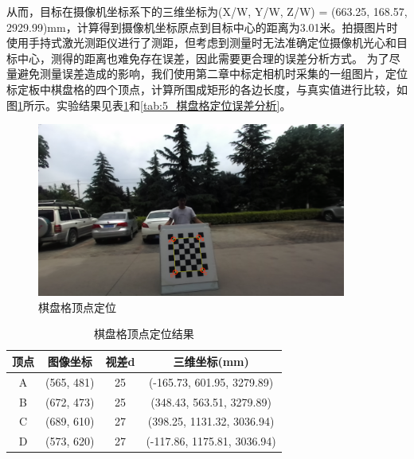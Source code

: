 从而，目标在摄像机坐标系下的三维坐标为(X/W, Y/W, Z/W) = (663.25, 168.57, 2929.99)mm，计算得到摄像机坐标原点到目标中心的距离为3.01米。拍摄图片时使用手持式激光测距仪进行了测距，但考虑到测量时无法准确定位摄像机光心和目标中心，测得的距离也难免存在误差，因此需要更合理的误差分析方式。
为了尽量避免测量误差造成的影响，我们使用第二章中标定相机时采集的一组图片，定位标定板中棋盘格的四个顶点，计算所围成矩形的各边长度，与真实值进行比较，如图\ref{fig:5_3_棋盘格顶点定位}所示。实验结果见表\ref{tab:5_棋盘格顶点定位结果}和\ref{tab:5_棋盘格定位误差分析}。
\begin{figure}[htb] %
	\centering
	\includegraphics[width=4in]{figures/5_实验结果/chessboard_corner}
	\caption{棋盘格顶点定位}\label{fig:5_3_棋盘格顶点定位}
\end{figure}

\begin{table}[htb] %
	\centering
	\caption{棋盘格顶点定位结果}
	\label{tab:5_棋盘格顶点定位结果}
	\begin{small}
		\begin{tabular*}{\textwidth}{@{\extracolsep{\fill}}cccc} \toprule[2pt]
			顶点 & 图像坐标   & 视差d & 三维坐标(mm) \\ \midrule[1pt]
			A     & (565, 481) & 25     & (-165.73, 601.95, 3279.89) \\
			B     & (672, 473) & 25     & (348.43, 563.51, 3279.89) \\
			C     & (689, 610) & 27     & (398.25, 1131.32, 3036.94) \\
			D     & (573, 620) & 27     & (-117.86, 1175.81, 3036.94) \\
			\bottomrule[2pt]
		\end{tabular*}
	\end{small}
\end{table}

